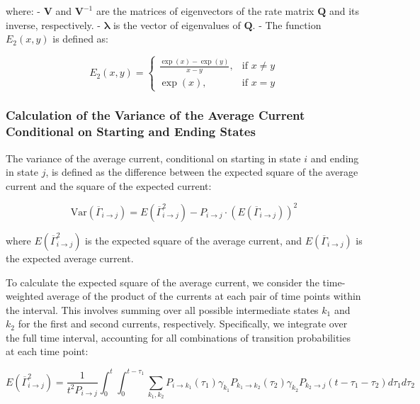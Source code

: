 \documentclass[pdflatex,sn-mathphys-num]{sn-jnl}%
\theoremstyle{thmstyleone}%
\theoremstyle{thmstyletwo}%
\theoremstyle{thmstylethree}%
\begin{document}
where:
- \( \mathbf{V} \) and \( \mathbf{V}^{-1} \) are the matrices of eigenvectors of the rate matrix \( \mathbf{Q} \) and its inverse, respectively.
- \( \boldsymbol{\lambda} \) is the vector of eigenvalues of \( \mathbf{Q} \).
- The function \( E_2(x, y) \) is defined as:

\begin{equation}
	E_2(x, y) = 
	\begin{cases}
		\frac{\exp(x) - \exp(y)}{x - y}, & \text{if } x \neq y \\
		\exp(x), & \text{if } x = y
	\end{cases}
    \label{eq:E_2}
\end{equation}


\subsubsection{Calculation of the Variance of the Average Current Conditional on Starting and Ending States}

The variance of the average current, conditional on starting in state \(i\) and ending in state \(j\), is defined as the difference between the expected square of the average current and the square of the expected current:

\begin{equation}
	\text{Var}(\overline{\Gamma}_{i \rightarrow j}) = E(\overline{\Gamma}_{i \rightarrow j}^2) - P_{i \rightarrow j} \cdot \left( E(\overline{\Gamma}_{i \rightarrow j}) \right)^2
    \label{eq:sigma_gamma_expression}
\end{equation}

where \( E(\overline{\Gamma}_{i \rightarrow j}^2) \) is the expected square of the average current, and \( E(\overline{\Gamma}_{i \rightarrow j}) \) is the expected average current.


To calculate the expected square of the average current, we consider the time-weighted average of the product of the currents at each pair of time points within the interval. This involves summing over all possible intermediate states \(k_1\) and \(k_2\) for the first and second currents, respectively. Specifically, we integrate over the full time interval, accounting for all combinations of transition probabilities at each time point:

\begin{equation}
	E(\overline{\Gamma}_{i \rightarrow j}^2) = \frac{1}{t^2 P_{i \rightarrow j}} \int_0^t \int_0^{t-\tau_1} \sum_{k_1, k_2} P_{i \rightarrow k_1}(\tau_1) \gamma_{k_1} P_{k_1 \rightarrow k_2}(\tau_2) \gamma_{k_2} P_{k_2 \rightarrow j}(t-\tau_1-\tau_2) d\tau_1 d\tau_2
    \label{eq:sqr_gamma_integral}
\end{equation}
\end{document}
